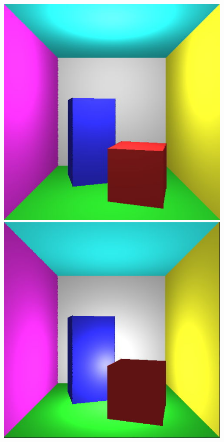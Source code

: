 \begin{figure}[H]
    \centering
    \includegraphics[width=\linewidth]{img/final1.jpg}
\endminipage
{}
    \centering
    \includegraphics[width=\linewidth]{img/final2.jpg}

\end{figure}
